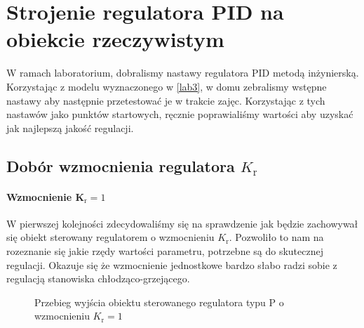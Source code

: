 \chapter{Strojenie regulatora PID na obiekcie rzeczywistym}
\label{lab5_pid}

W ramach laboratorium, dobralismy nastawy regulatora PID metodą inżynierską.
Korzystając z modelu wyznaczonego w \ref{lab3}, w domu zebralismy wstępne nastawy
aby następnie przetestować je w trakcie zajęc. Korzystając z tych nastawów 
jako punktów startowych, ręcznie poprawialiśmy wartości aby uzyskać jak 
najlepszą jakość regulacji.

\section{Dobór wzmocnienia regulatora $K_{\mathrm{r}}$}

\subsubsection{Wzmocnienie $\mathbf{K_{\mathrm{r}}} = \num{1}$}
W pierwszej kolejności zdecydowaliśmy się na sprawdzenie jak będzie zachowywał się
obiekt sterowany regulatorem o wzmocnieniu $K_{\mathrm{r}}$. Pozwoliło to nam
na rozeznanie się jakie rzędy wartości parametru, potrzebne są do skutecznej
regulacji. Okazuje się że wzmocnienie jednostkowe bardzo słabo radzi sobie
z regulacją stanowiska chłodząco-grzejącego. 

\begin{figure}[t]
    \centering
    \caption{Przebieg wyjścia obiektu sterowanego regulatora typu P o wzmocnieniu $K_{\mathrm{r}} = \num{1}$}
    \label{zad5_niegasnace_oscylacje}
\end{figure}

